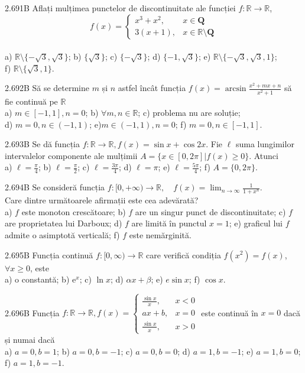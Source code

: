 \documentclass[11pt]{article}
\begin{document}
2.691B Aflați mulțimea punctelor de discontinuitate ale funcției $f: \mathbb{R} \rightarrow \mathbb{R}$, $$
f(x)= \begin{cases}x^{3}+x^{2}, & x \in \mathbf{Q} \\ 3(x+1), & x \in \mathbb{R} \setminus \mathbf{Q}\end{cases}$$\\ a) $\mathbb{R} \setminus \{-\sqrt{3},\sqrt{3}\}$; b) $\{\sqrt{3}\}$; c) $\{-\sqrt{3}\}$; d) $\{-1,\sqrt{3}\}$; e) $\mathbb{R} \setminus \{-\sqrt{3},\sqrt{3},1\}$;\\ f) $\mathbb{R} \setminus \{\sqrt{3},1\}$.

2.692B Să se determine $m$ și $n$ astfel încât funcția $f(x)=\arcsin \frac{x^{2}+m x+n}{x^{2}+1}$ să fie continuă pe $\mathbb{R}$\\ a) $m \in [-1,1], n=0$; b) $\forall m,n \in \mathbb{R}$; c) problema nu are soluție;\\ d) $m=0, n \in (-1,1)$; e)$m \in (-1,1), n=0$; f) $m=0 , n \in [-1,1]$.

2.693B Se dă funcția $f: \mathbb{R} \rightarrow \mathbb{R}, f(x) = \sin x + \cos 2x$. Fie $\ell$ suma lungimilor intervalelor componente ale mulțimii $A = \{ x \in [0, 2\pi] | f(x) \geq 0 \}$. Atunci\\ a) $\ell = \frac{\pi}{4}$; b) $\ell = \frac{\pi}{2}$; c) $\ell = \frac{3\pi}{4}$; d) $\ell = \pi$; e) $\ell = \frac{5\pi}{4}$; f) $A = \{0, 2\pi\}$.

2.694B Se consideră funcția $f: [0, +\infty) \rightarrow \mathbb{R}, \quad f(x) = \lim_{n \to \infty} \frac{1}{1 + x^n}$.\\Care dintre următoarele afirmații este cea adevărată?\\ a) $f$ este monoton crescătoare; b) $f$ are un singur punct de discontinuitate; c) $f$ are proprietatea lui Darboux; d) $f$ are limită în punctul $x=1$; e) graficul lui $f$ admite o asimptotă verticală; f) $f$ este nemărginită.

2.695B Funcția continuă $f: [0, \infty) \rightarrow \mathbb{R}$ care verifică condiția $f(x^2) = f(x)$, $\forall x \geq 0$, este\\ a) o constantă; b) $\mathrm{e}^{x}$; c) $\ln x$; d) $\alpha x + \beta$; e) $e \sin x$; f) $\cos x$.

2.696B Funcția $f: \mathbb{R} \rightarrow \mathbb{R}, f(x) = \begin{cases} \frac{\sin x}{x}, & x < 0 \\ ax + b, & x = 0 \\ \frac{\sin x}{x}, & x > 0\end{cases}$ este continuă în $x = 0$ dacă și numai dacă \\ a) $a=0, b=1$; b) $a=0, b=-1$; c) $a=0, b=0$; d) $a=1, b=-1$; e) $a=1, b=0$; f) $a=1, b=-1$.
\end{document}
